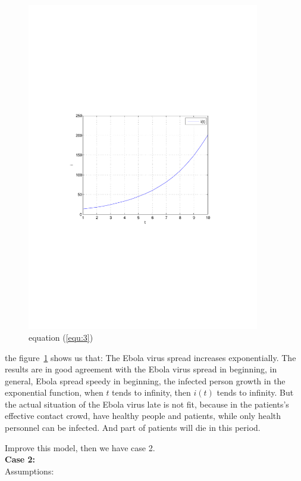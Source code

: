 \begin{figure}
\includegraphics[width=4in]{imgs/i(t).pdf}
\caption{equation (\ref{equ:3})}
\label{fig:1}
\end{figure}
the figure~\ref{fig:1} shows us that: 
The Ebola virus spread increases exponentially.
The results are in good agreement with 
the Ebola virus spread in beginning, in general, Ebola
spread speedy in beginning, the infected person growth in the
exponential function, when $t$ tends to infinity, then $i(t)$
tends to infinity. But the actual situation of the Ebola virus
late is not fit, because in the patients's effective
contact crowd, have healthy people and patients, while only
health personnel can be infected. And part of patients will die
in this period.\par
Improve this model, then we have case 2.\\
\textbf{Case 2:}\\
Assumptions:
